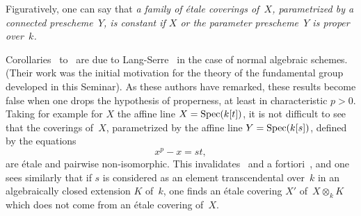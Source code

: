 Figuratively, one can say that \emph{a family of
\'etale coverings of~$X$, parametrized by a
connected prescheme~$Y$, is constant if $X$ or the
parameter prescheme~$Y$ is proper over~$k$.}

\begin{remarks}
\label{X.1.10}
Corollaries~ to~ are due to
Lang-Serre~\cite{X.2} in the case of normal algebraic schemes.
(Their work was the initial motivation for the theory
of the fundamental group developed in this Seminar). As
these authors have remarked, these results become false
when one drops the hypothesis of properness, at least in
characteristic $p>0$. Taking for example for $X$ the affine
line $X=\operatorname{Spec}(k[t])$, it is not difficult to see that the
coverings of~$X$, parametrized by the affine line
$Y=\operatorname{Spec}(k[s])$, defined by the equations
$$
x^p - x = st,
$$
are \'etale and pairwise non-isomorphic. This invalidates~
and a fortiori~, and one sees
similarly that if $s$ is considered as an element
transcendental over~$k$ in an algebraically closed extension $K$
of~$k$, one finds an \'etale covering $X'$ of~$X\otimes_kK$
which does not come from an \'etale covering of~$X$.
\end{remarks}
